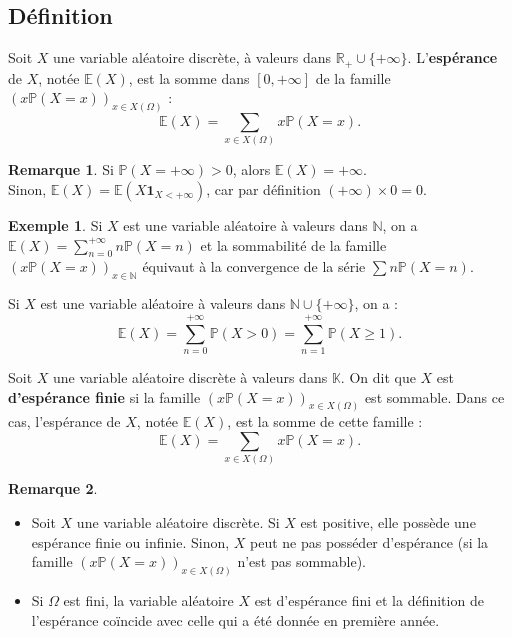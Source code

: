\documentclass[french]{article}
\renewcommand{\P}{\mathbb{P}}
\newcommand{\N}{\mathbb{N}}
\newcommand{\R}{\mathbb{R}}
\newcommand{\K}{\mathbb{K}}
\newcommand{\E}{\mathbb{E}}
\theoremstyle{plain}
\theoremstyle{definition}
\newtheorem*{ex}{Exemple}
\newtheorem*{rmq}{Remarque}
\theoremstyle{remark}
\begin{document}
\subsection{Définition}

\begin{dfn}
	Soit $X$ une variable aléatoire discrète, à valeurs dans $\R_+\cup\{+\infty\}$. L'\textbf{espérance} de $X$, notée $\E(X)$, est la somme dans $[0,+\infty]$ de la famille $(x\P(X=x))_{x\in X(\Omega)}$ : $$\E(X)=\sum_{x\in X(\Omega)}x\P(X=x).$$
\end{dfn}

\begin{rmq}
	Si $\P(X=+\infty)>0$, alors $\E(X)=+\infty$. \\
	Sinon, $\E(X)=\E(X\textbf{1}_{X<+\infty})$, car par définition $(+\infty)\times 0=0$.
\end{rmq}

\begin{ex}
	Si $X$ est une variable aléatoire à valeurs dans $\N$, on a $\E(X)=\displaystyle\sum_{n=0}^{+\infty}n\P(X=n)$ et la sommabilité de la famille $(x\P(X=x))_{x\in\N}$ équivaut à la convergence de la série $\displaystyle\sum n\P(X=n)$.
\end{ex}

\begin{prop}%
	Si $X$ est une variable aléatoire à valeurs dans $\N\cup\{+\infty\}$, on a :
	$$\E(X)=\sum_{n=0}^{+\infty}\P(X>0)=\sum_{n=1}^{+\infty}\P(X\geqslant 1).$$
\end{prop}

\begin{dfn}
	Soit $X$ une variable aléatoire discrète à valeurs dans $\K$. On dit que $X$ est \textbf{d'espérance finie} si la famille $(x\P(X=x))_{x\in X(\Omega)}$ est sommable. Dans ce cas, l'espérance de $X$, notée $\E(X)$, est la somme de cette famille :
	$$\E(X)=\sum_{x\in X(\Omega)}x\P(X=x).$$
\end{dfn}

\begin{rmq}
	\begin{itemize}
		\item Soit $X$ une variable aléatoire discrète. Si $X$ est positive, elle possède une espérance finie ou infinie. Sinon, $X$ peut ne pas posséder d'espérance (si la famille $(x\P(X=x))_{x\in X(\Omega)}$ n'est pas sommable).
		\item Si $\Omega$ est fini, la variable aléatoire $X$ est d'espérance fini et la définition de l'espérance coïncide avec celle qui a été donnée en première année.
	\end{itemize}
\end{rmq}
\end{document}
